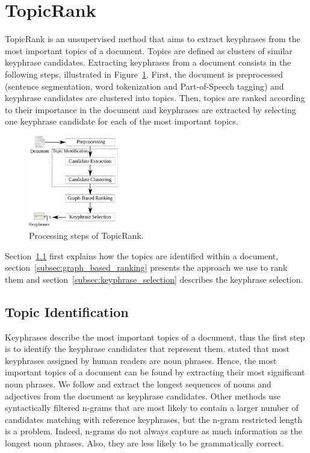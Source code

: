 \section{TopicRank}
\label{sec:clusterrank_approach}
  TopicRank is an unsupervised method that aims to extract keyphrases from the
  most important topics of a document. Topics are defined as clusters of similar
  keyphrase candidates. Extracting keyphrases from a document consists in the
  following steps, illustrated in Figure~\ref{fig:processing_steps}. First, the
  document is preprocessed (sentence segmentation, word tokenization and
  Part-of-Speech tagging) and keyphrase candidates are clustered into topics.
  Then, topics are ranked according to their importance in the document and
  keyphrases are extracted by selecting one keyphrase candidate for each of the
  most important topics.
  \begin{figure}
    \centering
    \includegraphics[width=0.35\textwidth]{include/processing_steps.eps}
    \caption{Processing steps of TopicRank. \label{fig:processing_steps}}
  \end{figure}

  Section~\ref{subsec:subjects_identification} first explains how the topics are
  identified within a document, section~\ref{subsec:graph_based_ranking}
  presents the approach we use to rank them and
  section~\ref{subsec:keyphrase_selection} describes the keyphrase selection.

  \subsection{Topic Identification}
  \label{subsec:subjects_identification}
    Keyphrases describe the most important topics of a document, thus the first
    step is to identify the keyphrase candidates that represent them.
     stated that most keyphrases assigned
    by human readers are noun phrases. Hence, the most important topics of a
    document can be found by extracting their most significant noun phrases.
    We follow  and extract the longest sequences of
    nouns and adjectives from the document as keyphrase candidates. Other
    methods use syntactically filtered n-grams that are most likely to contain a
    larger number of candidates matching with reference keyphrases, but the
    n-gram restricted length is a problem. Indeed, n-grams do not always capture
    as much information as the longest noun phrases. Also, they are less likely
    to be grammatically correct.

